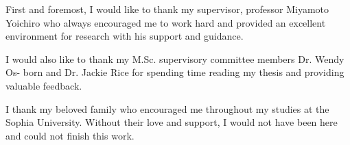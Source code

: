 \begin{acknowledgement}
First and foremost, I would like to thank my supervisor, professor Miyamoto Yoichiro who always encouraged me to work hard and provided an excellent environment for research with his support and guidance.

I would also like to thank my M.Sc. supervisory committee members Dr. Wendy Os- born and Dr. Jackie Rice for spending time reading my thesis and providing valuable feedback.

I thank my beloved family who encouraged me throughout my studies at the Sophia University. Without their love and support, I would not have been here and could not finish this work.
\end{acknowledgement}
